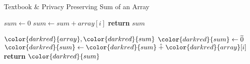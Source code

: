 \begin{algorithm}[H]
\caption{Textbook \& Privacy Preserving Sum of an Array}\label{a:sum}
\begin{algorithmic}[1]
\renewcommand{\algorithmicrequire}{\textbf{Private Vars:}}

    \State $sum  \gets 0$
        \State $sum \gets sum + array[i]$
    \EndFor
    \State \textbf{return} {$sum$}
\EndProcedure

\begin{spacing}{0.5}
\end{spacing}

\Require ${\color{darkred}{array}}, {\color{darkred}{sum}}$
    \State ${\color{darkred}{sum}} \gets \enc{0}$
        \State ${\color{darkred}{sum}} \gets {\color{darkred}{sum}} \hplus{\color{darkred}{array}}[i]$
    \EndFor
    \State \textbf{return} {${\color{darkred}{sum}}$}
\EndProcedure

\end{algorithmic}
\end{algorithm}
